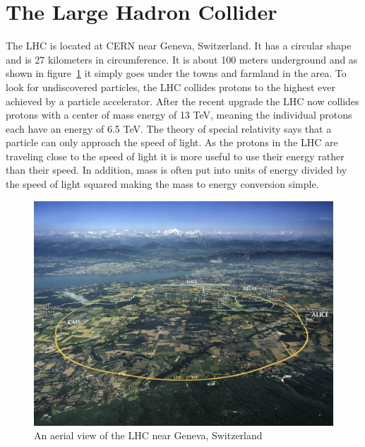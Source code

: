
\section{The Large Hadron Collider}

The LHC is located at CERN near Geneva, Switzerland. It has a circular shape and is 27 kilometers in circumference. It is about 100 meters underground and as shown in figure~\ref{fig:LHC} it simply goes under the towns and farmland in the area. To look for undiscovered particles, the LHC collides protons to the highest ever achieved by a particle accelerator. After the recent upgrade the LHC now collides protons with a center of mass energy of 13 TeV, meaning the individual protons each have an energy of 6.5 TeV. The theory of special relativity says that a particle can only approach the speed of light. As the protons in the LHC are traveling close to the speed of light it is more useful to use their energy rather than their speed. In addition, mass is often put into units of energy divided by the speed of light squared making the mass to energy conversion simple. 

\begin{figure}
\centering
\includegraphics[width=0.8\linewidth]{Figures/LHC.jpg}
\caption{An aerial view of the LHC near Geneva, Switzerland~\cite{LHC_view}}
\label{fig:LHC}
\end{figure}

